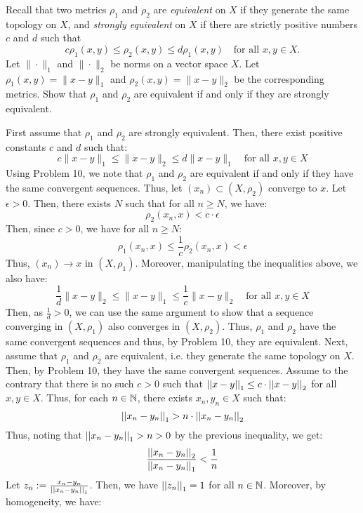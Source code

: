 \documentclass[12pt]{article}
\begin{document}


\begin{problem}{1}
    Recall that two metrics $\rho_1$ and $\rho_2$ are \emph{equivalent} on $X$ if they generate the same topology on $X$, and \emph{strongly equivalent} on $X$ if there are strictly positive numbers $c$ and $d$ such that
    \[
    c \rho_1(x, y) \leq \rho_2(x, y) \leq d \rho_1(x, y)
    \quad \text{for all } x, y \in X.
    \]
    Let $\| \cdot \|_1$ and $\| \cdot \|_2$ be norms on a vector space $X$. Let $\rho_1(x, y) = \|x - y\|_1$ and $\rho_2(x, y) = \|x - y\|_2$ be the corresponding metrics. Show that $\rho_1$ and $\rho_2$ are equivalent if and only if they are strongly equivalent.
\end{problem}
\begin{solution}
    First assume that $\rho_1$ and $\rho_2$ are strongly equivalent. Then, there exist positive constants $c$ and $d$ such that:
    \[c \|x - y\|_1 \leq \|x - y\|_2 \leq d \|x - y\|_1\quad \text{for all } x, y \in X \]
    Using Problem 10, we note that $\rho_1$ and $\rho_2$ are equivalent if and only if they have the same convergent sequences. Thus, let $(x_n) \subset (X, \rho_2)$ converge to $x$. Let $\epsilon > 0$. Then, there exists $N$ such that for all $n \geq N$, we have: 
    \[ \rho_2(x_n, x) < c \cdot \epsilon\]
    Then, since $c > 0$, we have for all $n \geq N$:
    \[ \rho_1(x_n, x) \leq \frac{1}{c}\rho_2(x_n, x) < \epsilon\]
    Thus, $(x_n) \to x$ in $(X, \rho_1)$. Moreover, manipulating the inequalities above, we also have: 
    \[\frac{1}{d} \|x - y\|_2 \leq \|x - y\|_1 \leq \frac{1}{c} \|x - y\|_2 \quad \text{for all } x, y \in X \]
    Then, as $\frac{1}{d} > 0$, we can use the same argument to show that a sequence converging in $(X, \rho_1)$ also converges in $(X, \rho_2)$. Thus, $\rho_1$ and $\rho_2$ have the same convergent sequences and thus, by Problem 10, they are equivalent. \bbni
    Next, assume that $\rho_1$ and $\rho_2$ are equivalent, i.e. they generate the same topology on $X$. Then, by Problem 10, they have the same convergent sequences. Assume to the contrary that there is no such $c > 0$ such that $\left\vert\left\vert x-y\right\vert\right\vert_1 \leq c\cdot \left\vert\left\vert x-y\right\vert\right\vert_2$ for all $x, y \in X$. Thus, for each $n \in \mathbb N$, there exists $x_n, y_n \in X$ such that:
    \[ \left\vert\left\vert x_n-y_n\right\vert\right\vert_1 > n \cdot \left\vert\left\vert x_n-y_n\right\vert\right\vert_2\]
    Thus, noting that $\left\vert\left\vert x_n-y_n\right\vert\right\vert_1 > n > 0$ by the previous inequality, we get:
    \[\frac{\left\vert\left\vert x_n-y_n\right\vert\right\vert_2}{\left\vert\left\vert x_n-y_n\right\vert\right\vert_1} < \frac{1}{n}\]
    Let $z_n := \frac{x_n - y_n}{\left\vert\left\vert x_n-y_n\right\vert\right\vert_1}$. Then, we have $\left\vert\left\vert z_n\right\vert\right\vert_1 = 1$ for all $n \in \mathbb N$. Moreover, by homogeneity, we have: 

\end{solution}
\end{document}
